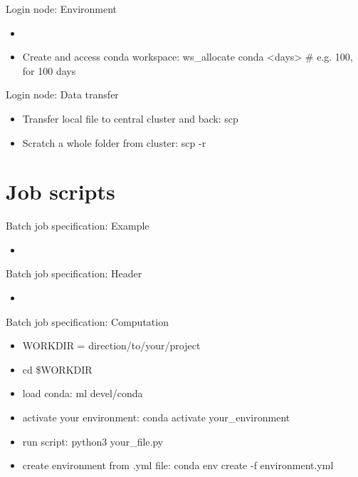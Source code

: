 \documentclass{beamer}
\begin{document}
\begin{frame}{Login node: Environment}

\begin{itemize}
    \item 
    \item Create and access conda workspace: ws\_allocate conda <days>   # e.g. 100, for 100 days
\end{itemize}


\end{frame}

\begin{frame}{Login node: Data transfer}

\begin{itemize}
    \item Transfer local file to central cluster and back: scp
    \item Scratch a whole folder from cluster: scp -r
\end{itemize}

\end{frame}

\section{Job scripts}


\begin{frame}{Batch job specification: Example}

\begin{itemize}
    \item 
\end{itemize}


\end{frame}

\begin{frame}{Batch job specification: Header}

\begin{itemize}
    \item 
\end{itemize}


\end{frame}

\begin{frame}{Batch job specification: Computation}

\begin{itemize}
    \item WORKDIR = direction/to/your/project
    \item cd \$WORKDIR
    \item load conda: ml devel/conda
    \item activate your environment: conda activate your\_environment
    \item run script: python3 your\_file.py
    \item create environment from .yml file: conda env create -f environment.yml
\end{itemize}


\end{frame}
\end{document}
